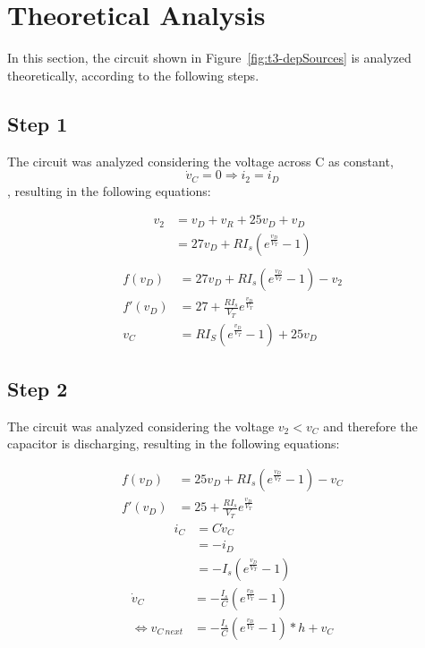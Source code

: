 \section{Theoretical Analysis}
\label{sec:analysis}

In this section, the circuit shown in Figure~\ref{fig:t3-depSources} is analyzed
theoretically, according to the following steps.


\subsection{Step 1}\label{subsec:step1}
The circuit was analyzed considering the voltage across C as constant,
$$\dot{v}_C = 0 \Rightarrow i_2=i_D$$,
resulting in the following equations:

\begin{equation}\label{step1}
  \begin{split}
    v_2 &= v_D + v_R + 25v_D + v_D\\
    &= 27v_D + RI_s(e^{\frac{v_D}{V_T}}-1)\\
  \end{split}
\end{equation}
\vspace{-15pt}
\begin{align}
  f(v_D)&=27v_D + RI_s(e^{\frac{v_D}{V_T}}-1) - v_2\\
  f'(v_D)&=27 + \frac{RI_s}{V_T}e^{\frac{v_D}{V_T}}\\
  v_C&=RI_S(e^{\frac{v_D}{V_T}}-1) + 25v_D
\end{align}




\subsection{Step 2}\label{subsec:step2}
The circuit was analyzed considering the voltage $v_2 < v_C$ and therefore the capacitor is
discharging, resulting in the following equations:

\begin{align}\label{step2}
  f(v_D)&=25v_D + RI_s(e^{\frac{v_D}{V_T}}-1) - v_C\\
  f'(v_D)&=25 + \frac{RI_s}{V_T}e^{\frac{v_D}{V_T}}
\end{align}
\vspace{-15pt}
\begin{equation}
  \begin{split}
    i_C &= C\dot{v}_C\\
    &=-i_D\\
    &=-I_s(e^{\frac{v_D}{V_T}}-1)
  \end{split}
\end{equation}
\vspace{-15pt}
\begin{equation}
\begin{split}
  \dot{v}_C &= -\frac{I_s}{C}(e^{\frac{v_D}{V_T}}-1)\\
  \Leftrightarrow v_{C\ next} &= -\frac{I_s}{C}(e^{\frac{v_D}{V_T}}-1)*h + v_C
\end{split}
\end{equation}



